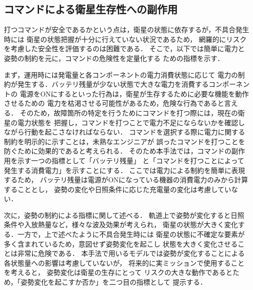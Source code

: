 \documentclass[11pt]{jsreport}
\begin{document}
\subsection{コマンドによる衛星生存性への副作用}
打つコマンドが安全であるかという点は，衛星の状態に依存するが，不具合発生時には
衛星の状態把握が十分に行えていない状況であるため，
網羅的にリスクを考慮した安全性を評価するのは困難である．
そこで，以下では簡単に電力と姿勢の制約を元に，コマンドの危険性を定量化する
ための指標を示す．

まず，運用時には発電量と各コンポーネントの電力消費状態に応じて
電力の制約が発生する．バッテリ残量が少ない状態で大きな電力を消費するコンポーネントの
電源をONにするといった行為は，衛星が生存するために必要な機能を動作させるための
電力を枯渇させる可能性があるため，危険な行為であると言える．
そのため，故障箇所の特定を行うためにコマンドを打つ際には，現在の衛星の電力状態を
把握し，コマンドを打つことで電力不足にならないかを確認しながら行動を起こさなければならない．
コマンドを選択する際に電力に関する制約を明示的に示すことは，未熟なエンジニアが
誤ったコマンドを打つことを防ぐために効果的であると考えられる．
そのため本手法では，コマンドの副作用を示す一つの指標として「バッテリ残量」
と「コマンドを打つことによって発生する消費電力」を示すことにする．
ここでは電力による制約を簡単に表現するため，
バッテリ残量は電源がONになっている機器の消費電力のみから計算することとし，
姿勢の変化や日照条件に応じた充電量の変化は考慮していない．

次に，姿勢の制約による指標に関して述べる．
軌道上で姿勢が変化すると日照条件や入放熱量など，様々な波及効果が考えられ，
衛星の状態が大きく変化する．一方で，上で述べたように不具合発生時には
衛星の状態に不確定な要素が多く含まれているため，意図せず姿勢変化を起こし
状態を大きく変化させることは非常に危険である．
本手法で用いるモデルでは姿勢が変化することによる各状態量への影響は考慮していないが，
将来的に実ミッションで使用することを考えると，%
姿勢変化は衛星の生存にとって
リスクの大きな動作であるとため，「姿勢変化を起こすか否か」を二つ目の指標として
提示する．
\end{document}
